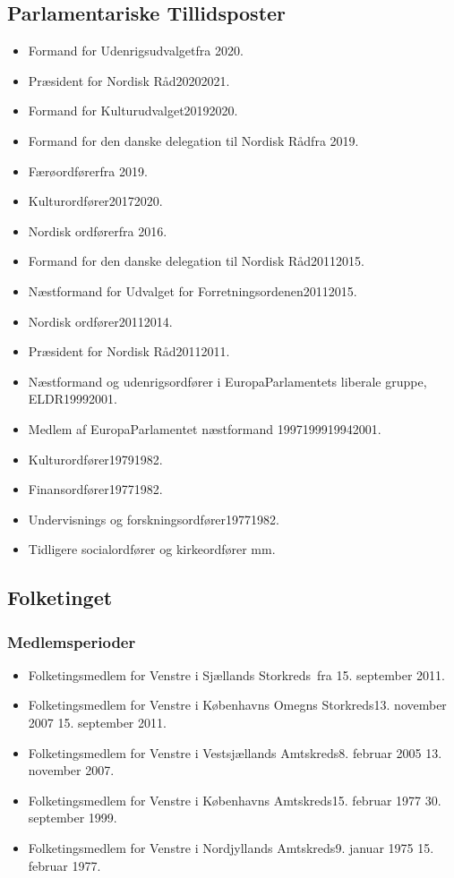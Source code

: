 \documentclass[11pt, a4paper]{awesome-cv}
\begin{document}
\begin{cvletter}
\subsection*{Parlamentariske Tillidsposter}
\begin{itemize}
\item Formand for Udenrigsudvalgetfra 2020.
\item Præsident for Nordisk Råd20202021.
\item Formand for Kulturudvalget20192020.
\item Formand for den danske delegation til Nordisk Rådfra 2019.
\item Færøordførerfra 2019.
\item Kulturordfører20172020.
\item Nordisk ordførerfra 2016.
\item Formand for den danske delegation til Nordisk Råd20112015.
\item Næstformand for Udvalget for Forretningsordenen20112015.
\item Nordisk ordfører20112014.
\item Præsident for Nordisk Råd20112011.
\item Næstformand og udenrigsordfører i EuropaParlamentets liberale gruppe, ELDR19992001.
\item Medlem af EuropaParlamentet næstformand 1997199919942001.
\item Kulturordfører19791982.
\item Finansordfører19771982.
\item Undervisnings og forskningsordfører19771982.
\item Tidligere socialordfører og kirkeordfører mm.
\end{itemize}
\subsection*{Folketinget}
\subsubsection*{Medlemsperioder}
\begin{itemize}
\item Folketingsmedlem for Venstre i Sjællands Storkreds fra 15. september 2011.
\item Folketingsmedlem for Venstre i Københavns Omegns Storkreds13. november 2007  15. september 2011.
\item Folketingsmedlem for Venstre i Vestsjællands Amtskreds8. februar 2005  13. november 2007.
\item Folketingsmedlem for Venstre i Københavns Amtskreds15. februar 1977  30. september 1999.
\item Folketingsmedlem for Venstre i Nordjyllands Amtskreds9. januar 1975  15. februar 1977.
\end{itemize}

\end{cvletter}
\end{document}
